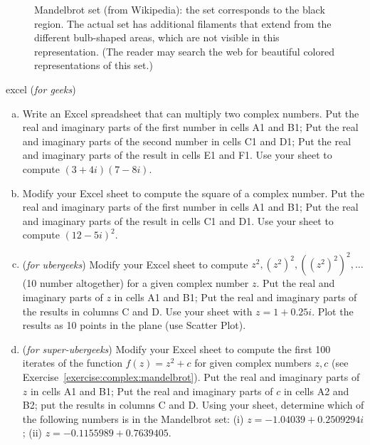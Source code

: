 \begin{figure}[hbt]  
\caption{Mandelbrot set (from Wikipedia): the set corresponds to the black region. The actual set has additional filaments that extend from the different bulb-shaped areas, which are not visible in this representation. (The reader may search the web for beautiful colored representations of this set.) \label{mandelbrot}}
\end{figure}

\begin{exercise}{excel} (\emph{for geeks})
\begin{enumerate}[(a)]
\item
Write an Excel spreadsheet that can multiply two complex numbers. Put the real and imaginary parts of the first number in cells A1 and B1; Put the real and imaginary parts of the second number in cells C1 and D1; Put the real and imaginary parts of the result in cells E1 and F1. Use your sheet to compute $(3 + 4i)(7 - 8i)$.
\item
Modify your Excel sheet to compute the square of a complex number. Put the real and imaginary parts of the first number in cells A1 and B1; Put the real and imaginary parts of the result in cells C1 and D1. Use your sheet to compute $(12 - 5i)^2$.
\item 
(\emph{for ubergeeks}) Modify your Excel sheet to compute $z^2, (z^2)^2,((z^2)^2)^2, \ldots$ (10 number altogether) for a given complex number $z$. Put the real and imaginary parts of $z$ in cells A1 and B1; Put the real and imaginary parts of the results in columns C and D. Use your sheet with $z = 1 + 0.25 i$. Plot the results as 10 points in the plane (use Scatter Plot).
\item
(\emph{for super-ubergeeks}) Modify your Excel sheet to compute the first 100 iterates of the function $f(z) = z^2 + c$ for given complex numbers $z,c$ (see Exercise~\ref{exercise:complex:mandelbrot}). Put the real and imaginary parts of $z$ in cells A1 and B1; Put the real and imaginary parts of $c$ in cells A2 and B2; put the results in columns C and D. Using your sheet, determine which of the following numbers is in the Mandelbrot set: (i) $z = -1.04039 + 0.2509294i$; (ii) $z=-0.1155989 + 0.7639405$.
\end{enumerate}
\end{exercise} 

